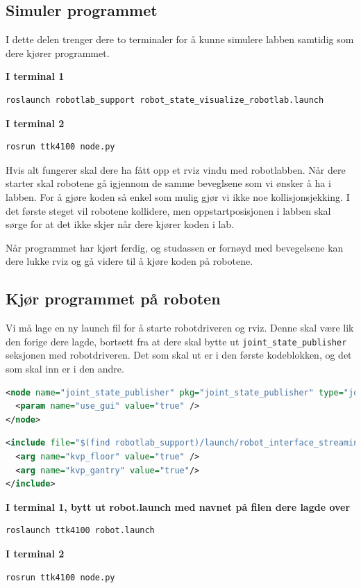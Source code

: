 \documentclass{article}
\begin{document}
\subsection{Simuler programmet}
I dette delen trenger dere to terminaler for å kunne simulere labben samtidig som dere kjører programmet.

\noindent\textbf{I terminal 1}
\begin{lstlisting}[language=bash]
roslaunch robotlab_support robot_state_visualize_robotlab.launch
\end{lstlisting}

\noindent\textbf{I terminal 2}
\begin{lstlisting}[language=bash]
rosrun ttk4100 node.py
\end{lstlisting}

Hvis alt fungerer skal dere ha fått opp et rviz vindu med robotlabben. Når dere starter  skal robotene gå igjennom de samme beveglsene som vi ønsker å ha i labben. For å gjøre koden så enkel som mulig gjør vi ikke noe kollisjonsjekking. I det første steget vil robotene kollidere, men oppstartposisjonen i labben skal sørge for at det ikke skjer når dere kjører koden i lab.

Når programmet har kjørt ferdig, og studassen er fornøyd med bevegelsene kan dere lukke rviz og gå videre til å kjøre koden på robotene.

\subsection{Kjør programmet på roboten}
Vi må lage en ny launch fil for å starte robotdriveren og rviz. Denne skal være lik den forige dere lagde, bortsett fra at dere skal bytte ut \texttt{joint\_state\_publisher} seksjonen med robotdriveren. Det som skal ut er i den første kodeblokken, og det som skal inn er i den andre.


\begin{lstlisting}[language=xml]
<node name="joint_state_publisher" pkg="joint_state_publisher" type="joint_state_publisher">
  <param name="use_gui" value="true" />
</node>

\end{lstlisting}

\begin{lstlisting}[language=xml]
<include file="$(find robotlab_support)/launch/robot_interface_streaming_robotlab.launch" >
  <arg name="kvp_floor" value="true" />
  <arg name="kvp_gantry" value="true"/>
</include>
\end{lstlisting}


\noindent\textbf{I terminal 1, bytt ut robot.launch med navnet på filen dere lagde over}
\begin{lstlisting}[language=bash]
roslaunch ttk4100 robot.launch
\end{lstlisting}

\noindent\textbf{I terminal 2}
\begin{lstlisting}[language=bash]
rosrun ttk4100 node.py
\end{lstlisting}

\clearpage

\printbibliography
\end{document}

